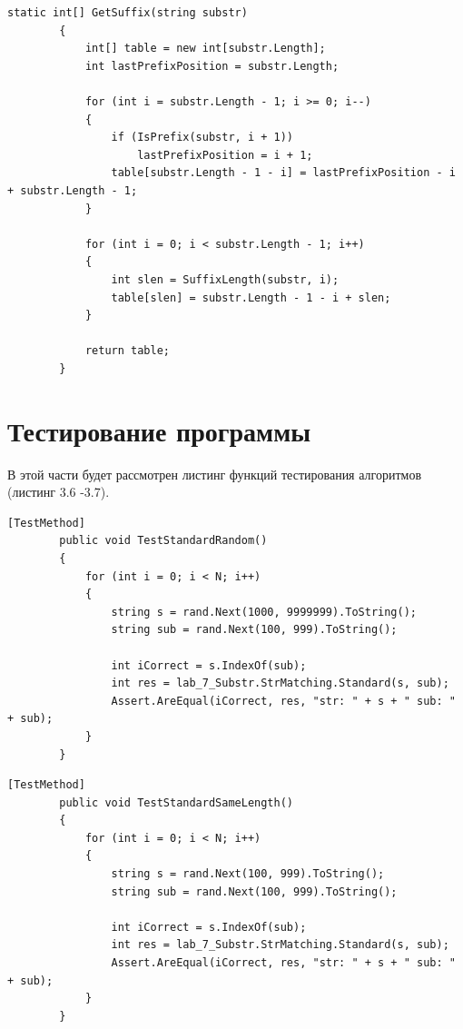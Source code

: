 \documentclass[12pt]{report}
\begin{document}
\begin{lstlisting}[label=some-code,caption=Функция вычисления сдвигов суффиксов]
        static int[] GetSuffix(string substr)
        {
            int[] table = new int[substr.Length];
            int lastPrefixPosition = substr.Length;

            for (int i = substr.Length - 1; i >= 0; i--)
            {
                if (IsPrefix(substr, i + 1))
                    lastPrefixPosition = i + 1;
                table[substr.Length - 1 - i] = lastPrefixPosition - i + substr.Length - 1;
            }

            for (int i = 0; i < substr.Length - 1; i++)
            {
                int slen = SuffixLength(substr, i);
                table[slen] = substr.Length - 1 - i + slen;
            }

            return table;
        }
\end{lstlisting}

\section{Тестирование программы}
 В этой части будет рассмотрен листинг функций тестирования алгоритмов (листинг 3.6 -3.7). 
\begin{lstlisting}[label=some-code,caption=Тестирование функции случайными значениями]
[TestMethod]
        public void TestStandardRandom()
        {
            for (int i = 0; i < N; i++)
            {
                string s = rand.Next(1000, 9999999).ToString();
                string sub = rand.Next(100, 999).ToString();

                int iCorrect = s.IndexOf(sub);
                int res = lab_7_Substr.StrMatching.Standard(s, sub);
                Assert.AreEqual(iCorrect, res, "str: " + s + " sub: " + sub);
            }
        }
\end{lstlisting}

\begin{lstlisting}[label=some-code,caption=Тестирование функции случайными значениями одной длины]
[TestMethod]
        public void TestStandardSameLength()
        {
            for (int i = 0; i < N; i++)
            {
                string s = rand.Next(100, 999).ToString();
                string sub = rand.Next(100, 999).ToString();

                int iCorrect = s.IndexOf(sub);
                int res = lab_7_Substr.StrMatching.Standard(s, sub);
                Assert.AreEqual(iCorrect, res, "str: " + s + " sub: " + sub);
            }
        }
\end{lstlisting}
\end{document}
